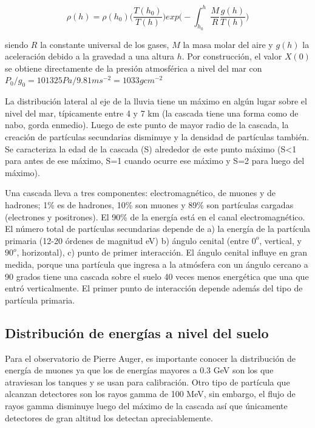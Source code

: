 \documentclass{book}
\begin{document}
\begin{equation}
\rho(h)=\rho(h_0)\Bigg(\frac{T(h_0)}{T(h)}\Bigg)exp\Bigg(-\int_{h_0}^{h}\frac{M}{R}\frac{g(h)}{T(h)}\Bigg)
\end{equation}

siendo $R$ la constante universal de los gases, $M$ la masa molar del aire y $g(h)$ la aceleraci\'on debido a la gravedad a una altura $h$. Por construcci\'on, el valor $X(0)$ se obtiene directamente de la presi\'on atmosf\'erica a nivel del mar con $P_0/g_0=101325Pa/9.81ms^{-2}=1033gcm^{-2}$ \citep{YUNIOR}

La distribuci\'on lateral al eje de la lluvia tiene un m\'aximo en alg\'un lugar sobre el nivel del mar, t\'ipicamente entre 4 y 7 km (la cascada tiene una forma como de nabo, gorda enmedio). Luego de este punto de mayor radio de la cascada, la creación de partículas secundarias disminuye y la densidad de partículas también. Se caracteriza la edad de la cascada (S) alrededor de este punto máximo (S<1 para antes de ese máximo, S=1 cuando ocurre ese máximo y S=2 para luego del máximo). \citep{ASOREY}\citep{SUAREZ}

Una cascada lleva a tres componentes: electromagn\'etico, de muones y de hadrones; 1\% es de hadrones, 10\% son muones y 89\% son part\'iculas cargadas (electrones y positrones). El 90\% de la energ\'ia est\'a en el canal electromagn\'etico. El n\'umero total de part\'iculas secundarias depende de a) la energ\'ia de la part\'icula primaria (12-20 \'ordenes de magnitud eV) b) \'angulo cenital (entre $0^o$, vertical, y $90^o$, horizontal), c) punto de primer interacci\'on. El \'angulo cenital influye en gran medida, porque una part\'icula que ingresa a la atm\'osfera con un \'angulo cercano a 90 grados tiene una cascada sobre el suelo 40 veces menos energ\'etica que una que entr\'o verticalmente. El primer punto de interacci\'on depende adem\'as del tipo de part\'icula primaria. \citep{ASOREY}\citep{SUAREZ}

\subsection{Distribuci\'on de energ\'ias a nivel del suelo}
Para el observatorio de Pierre Auger, es importante conocer la distribuci\'on de energ\'ia de muones ya que los de energ\'ias mayores a 0.3 GeV son los que atraviesan los tanques y se usan para calibraci\'on. Otro tipo de part\'icula que alcanzan detectores son los rayos gamma de 100 MeV, sin embargo, el flujo de rayos gamma disminuye luego del m\'aximo de la cascada as\'i que \'unicamente detectores de gran altitud los detectan apreciablemente. \citep{WATSON}
\end{document}
